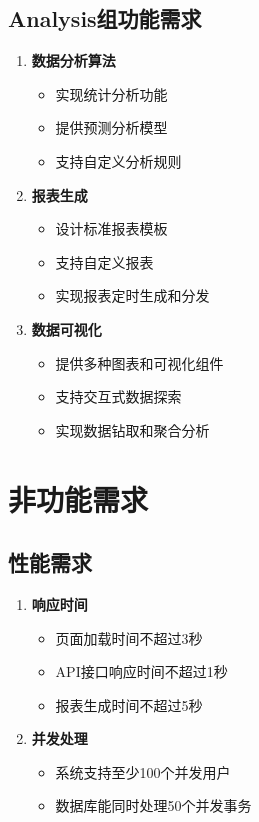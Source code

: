 \documentclass[a4paper,12pt]{article}
\begin{document}
\subsection{Analysis组功能需求}

\begin{enumerate}
  \item \textbf{数据分析算法}
  \begin{itemize}
    \item 实现统计分析功能
    \item 提供预测分析模型
    \item 支持自定义分析规则
  \end{itemize}
  
  \item \textbf{报表生成}
  \begin{itemize}
    \item 设计标准报表模板
    \item 支持自定义报表
    \item 实现报表定时生成和分发
  \end{itemize}
  
  \item \textbf{数据可视化}
  \begin{itemize}
    \item 提供多种图表和可视化组件
    \item 支持交互式数据探索
    \item 实现数据钻取和聚合分析
  \end{itemize}
\end{enumerate}

\section{非功能需求}

\subsection{性能需求}

\begin{enumerate}
  \item \textbf{响应时间}
  \begin{itemize}
    \item 页面加载时间不超过3秒
    \item API接口响应时间不超过1秒
    \item 报表生成时间不超过5秒
  \end{itemize}
  
  \item \textbf{并发处理}
  \begin{itemize}
    \item 系统支持至少100个并发用户
    \item 数据库能同时处理50个并发事务
  \end{itemize}
  
\end{enumerate}
\end{document}
